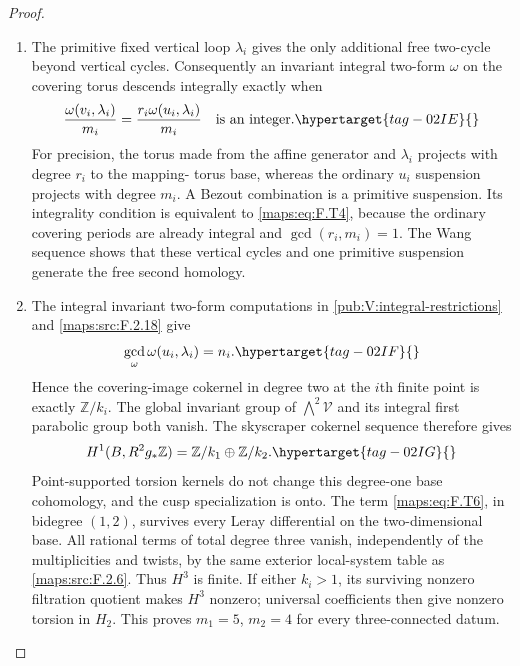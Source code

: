 \documentclass[11pt,a4paper]{article}
\numberwithin{equation}{section}
\theoremstyle{definition}
\begin{document}
\begin{proof}
\begin{enumerate}[label=\arabic*.]
\item The primitive fixed vertical loop $\lambda_i$ gives the
only additional free two-cycle beyond vertical cycles.
Consequently an invariant integral two-form $\omega$ on
the covering torus descends integrally exactly when
\begin{equation}
 \frac{\omega(v_i,\lambda_i)}{m_i}
       =\frac{r_i\omega(u_i,\lambda_i)}{m_i}
       \quad\text{is an integer}.
 \hypertarget{tag-02IE}{}\label{maps:eq:F.T4}
\end{equation}
For precision, the torus made from the affine generator
and $\lambda_i$ projects with degree $r_i$ to the mapping-
torus base, whereas the ordinary $u_i$ suspension projects
with degree $m_i$.  A Bezout combination is a primitive
suspension.  Its integrality condition is equivalent to
\eqref{maps:eq:F.T4}, because the ordinary covering periods are already
integral and $\gcd(r_i,m_i)=1$.
The Wang sequence shows that these vertical cycles and one
primitive suspension generate the free second homology.

\item The integral invariant two-form computations in
\cref{pub:V:integral-restrictions} and \ref{maps:src:F.2.18} give
\begin{equation}
 \gcd_{\omega}\omega(u_i,\lambda_i)=n_i.
 \hypertarget{tag-02IF}{}\label{maps:eq:F.T5}
\end{equation}
Hence the covering-image cokernel in degree two at the
$i$th finite point is exactly $\mathbb Z/k_i$.
The global invariant group of $\bigwedge^2\mathcal V$
and its integral first parabolic group both vanish.
The skyscraper cokernel sequence therefore gives
\begin{equation}
 H^1(B,R^2g_*\mathbb Z)
       =\mathbb Z/k_1\oplus\mathbb Z/k_2.
 \hypertarget{tag-02IG}{}\label{maps:eq:F.T6}
\end{equation}
Point-supported torsion kernels do not change this degree-one
base cohomology, and the cusp specialization is onto.
The term \eqref{maps:eq:F.T6}, in bidegree $(1,2)$, survives every Leray
differential on the two-dimensional base.
All rational terms of total degree three vanish, independently
of the multiplicities and twists, by the same exterior
local-system table as \ref{maps:src:F.2.6}.  Thus $H^3$ is finite.
If either $k_i>1$, its surviving nonzero filtration quotient
makes $H^3$ nonzero; universal coefficients then give
nonzero torsion in $H_2$.
This proves $m_1=5$, $m_2=4$ for every three-connected datum.


\end{enumerate}
\end{proof}
\end{document}
